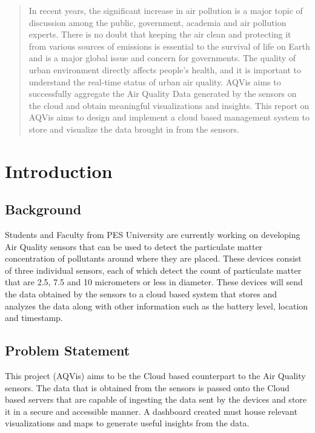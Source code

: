 \documentclass[]{report}
\begin{document}
 

\begin{abstract}
 In recent years, the significant increase in air pollution is a major topic of discussion among the public, government, academia and air pollution experts. There is no doubt that keeping the air clean and protecting it from various sources of emissions is essential to the survival of life on Earth and is a major global issue and concern for governments. The quality of urban environment directly affects people's health, and it is important to understand the real-time status of urban air quality. AQVis aims to successfully aggregate the Air Quality Data generated by the sensors on the cloud and obtain meaningful visualizations and insights. This report on AQVis aims to design and implement a cloud based management system to store and visualize the data brought in from the sensors.
\end{abstract}

\tableofcontents
\listoffigures
\listoftables



\chapter{Introduction}

\section{Background}
Students and Faculty from PES University are currently working on developing Air Quality sensors that can be used to detect the particulate matter concentration of pollutants around where they are placed. These devices consist of three individual sensors, each of which detect the count of particulate matter that are 2.5, 7.5 and 10 micrometers or less in diameter. These devices will send the data obtained by the sensors to a cloud based system that stores and analyzes the data along with other information such as the battery level, location and timestamp.

\section{Problem Statement}
This project (AQVis) aims to be the Cloud based counterpart to the Air Quality sensors. The data that is obtained from the sensors is passed onto the Cloud based servers that are capable of ingesting the data sent by the devices and store it in a secure and accessible manner. A dashboard created must house relevant visualizations and maps to generate useful insights from the data.
\end{document}
